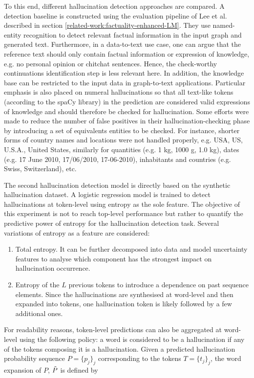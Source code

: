 To this end, different hallucination detection approaches are compared. A detection baseline is constructed using the evaluation pipeline of Lee et al.\cite{factualityEnhancedLM} described in section \ref{related-work:factuality-enhanced-LM}. They use named-entity recognition to detect relevant factual information in the input graph and generated text. Furthermore, in a data-to-text use case, one can argue that the reference text should only contain factual information or expression of knowledge, e.g. no personal opinion or chitchat sentences. Hence, the check-worthy continuations identification step is less relevant here. In addition, the knowledge base can be restricted to the input data in graph-to-text applications. Particular emphasis is also placed on numeral hallucinations so that all text-like tokens (according to the spaCy library) in the prediction are considered valid expressions of knowledge and should therefore be checked for hallucination. Some efforts were made to reduce the number of false positives in their hallucination-checking phase by introducing a set of equivalents entities to be checked. For instance, shorter forms of country names and locations were not handled properly, e.g. USA, US, U.S.A., United States, similarly for quantities (e.g. 1 kg, 1000 g, 1.0 kg), dates (e.g. 17 June 2010, 17/06/2010, 17-06-2010), inhabitants and countries (e.g. Swiss, Switzerland), etc.   

The second hallucination detection model is directly based on the synthetic hallucination dataset. A logistic regression model is trained to detect hallucinations at token-level using entropy as the sole feature. The objective of this experiment is not to reach top-level performance but rather to quantify the predictive power of entropy for the hallucination detection task. Several variations of entropy as a feature are considered:
\begin{enumerate}
    \item Total entropy. It can be further decomposed into data and model uncertainty features to analyse which component has the strongest impact on hallucination occurrence. 
    \item Entropy of the $L$ previous tokens to introduce a dependence on past sequence elements. Since the hallucinations are synthesised at word-level and then expanded into tokens, one hallucination token is likely followed by a few additional ones. 
\end{enumerate}

For readability reasons, token-level predictions can also be aggregated at word-level using the following policy: a word is considered to be a hallucination if any of the tokens composing it is a hallucination. Given a predicted hallucination probability sequence $P = \{p_j\}_j$ corresponding to the tokens $T = \{t_j\}_j$, the word expansion of $P$, $\Tilde{P}$ is defined by 

